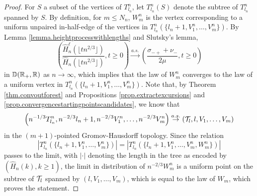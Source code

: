 \begin{proof}
For $S$ a subset of the vertices of $T^n_{l_n}$, let $T^n_{l_n}(S)$ denote the subtree of $T^n_{l_n}$ spanned by $S$. By definition, for $m\leq N_n$, $W^n_m$ is the vertex corresponding to a uniform unpaired in-half-edge of the vertices in $T^n_{l_n}\left(\{l_n+1,V^n_1,\dots,V^n_{m}\}\right)$. By Lemma \ref{lemma.heightprocesswithlengths} and Slutsky's lemma,
$$\left(\frac{\hat{H}_n^\ell\left(\lfloor t n^{2/3}\rfloor \right)}{\hat{H}_n\left(\lfloor t n^{2/3}\rfloor \right)},t\geq 0\right)\overset{a.s.}{\to} \left(\frac{\sigma_{-+}+\nu_-}{2\mu},t\geq 0\right)$$
in ${\mathbb D}({\mathbb R}_+,{\mathbb R})$ as $n\to \infty$, which implies that the law of $W^n_m$ converges to the law of a uniform vertex in $T^n_{l_n}\left(\{l_n+1,V^n_1,\dots,V^n_{m}\}\right)$. 
Note that, by Theorem \ref{thm.convoutforest} and  Propositions \ref{prop.extractexcursions} and \ref{prop.convergencestartingpointscandidates}, we know that
$$\left(n^{-1/3}T^n_{l_n},n^{-2/3}l_n+1,n^{-2/3}V^n_1,\dots,n^{-2/3}V^n_{m}\right)\overset{a.s.}{\to}\left({\mathcal T}_l, l,V_1,\dots,V_m\right)$$
in the $(m+1)$-pointed Gromov-Hausdorff topology. Since the relation $$\left|T^n_{l_n}\left(\{l_n+1,V^n_1,\dots,V^n_{m}\}\right)\right|=\left|T^n_{l_n}\left(\{l_n+1,V^n_1,\dots,V^n_{m}, W^n_{m}\}\right)\right|$$ passes to the limit, with $|\cdot|$ denoting the length in the tree as encoded by $(\hat{H}_n(k),k\geq 1)$, the limit in distribution of $n^{-2/3}W^n_m$ is a uniform point on the subtree of ${\mathcal T}_l$ spanned by $\left(l,V_1,\dots,V_m\right)$, which is equal to the law of $W_m$, which proves the statement.
\end{proof}

